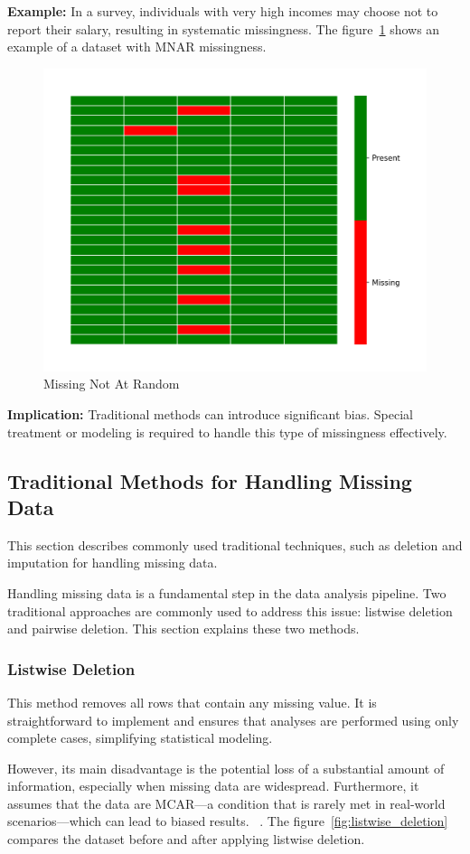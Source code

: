 \documentclass[a4paper,12pt]{article}
\begin{document}
\textbf{Example:} In a survey, individuals with very high incomes may choose not to report their salary, resulting in systematic missingness. The figure~\ref{fig:mnar_heatmap} shows an example of a dataset with MNAR missingness.

\begin{figure}[H]
\centering
\includegraphics[width=0.5\linewidth]{MNAR_heatmap.png}
\caption{Missing Not At Random}
\label{fig:mnar_heatmap}
\end{figure}

\textbf{Implication:} Traditional methods can introduce significant bias. Special treatment or modeling is required to handle this type of missingness effectively.

\subsection{Traditional Methods for Handling Missing Data}

This section describes commonly used traditional techniques, such as deletion and imputation for handling missing data.

Handling missing data is a fundamental step in the data analysis pipeline. Two traditional approaches are commonly used to address this issue: listwise deletion and pairwise deletion. This section explains these two methods.

\subsubsection{Listwise Deletion}

This method removes all rows that contain any missing value. It is straightforward to implement and ensures that analyses are performed using only complete cases, simplifying statistical modeling.

However, its main disadvantage is the potential loss of a substantial amount of information, especially when missing data are widespread. Furthermore, it assumes that the data are MCAR—a condition that is rarely met in real-world scenarios—which can lead to biased results. ~\cite{3}. The figure~\ref{fig:listwise_deletion} compares the dataset before and after applying listwise deletion.
\end{document}
